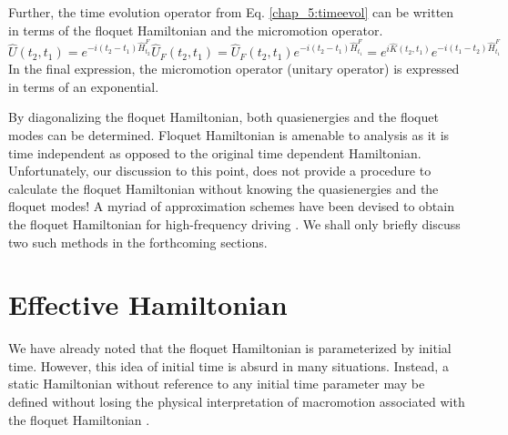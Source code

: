 Further, the time evolution operator from Eq. \eqref{chap_5:timeevol} can be written in terms of the floquet Hamiltonian and the micromotion operator.
\begin{equation}
 \hat{U}(t_2, t_1) = e^{-i(t_2 - t_1)\hat{H}_{t_2}^{F}}\hat{U}_{F}(t_2, t_1) = \hat{U}_{F}(t_2, t_1)e^{-i(t_2 - t_1)\hat{H}_{t_1}^{F}} = e^{i\hat{K}(t_2, t_1)}e^{-i(t_1 - t_2)\hat{H}_{t_1}^{F}}
\end{equation} In the final expression, the micromotion operator (unitary operator) is expressed in terms of an exponential.

By diagonalizing the floquet Hamiltonian, both quasienergies and the floquet modes can be determined. Floquet Hamiltonian is amenable to analysis as it is time independent
as opposed to the original time dependent Hamiltonian. Unfortunately, our discussion to this point, does not provide a procedure to calculate the floquet Hamiltonian without
knowing the quasienergies and the floquet modes! A myriad of approximation schemes have been devised to obtain the floquet Hamiltonian for high-frequency driving 
\parencite{casas2001floquet,goldman2014periodically,anisimovas2015high,mikami2016brillouin,grozdanov1988quantum}. We shall only briefly discuss two such methods in the forthcoming sections.

\section{Effective Hamiltonian}
We have already noted that the floquet Hamiltonian is parameterized by initial time. However, this idea of initial time is absurd in many situations.
Instead, a static Hamiltonian without reference to any initial time parameter may be defined without losing the physical interpretation of macromotion associated with the 
floquet Hamiltonian \parencite{rahav2003effective, goldman2014periodically, anisimovas2015high}.

